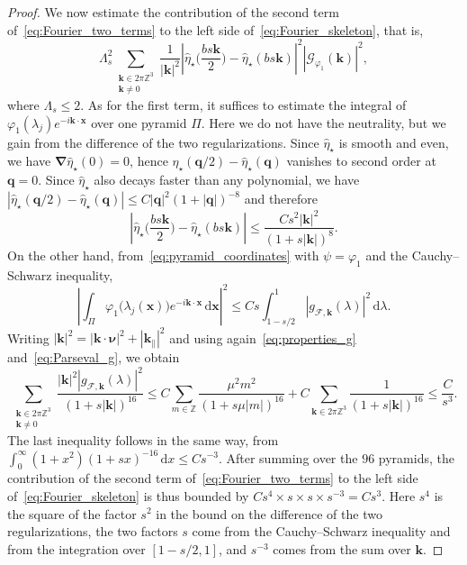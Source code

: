 \documentclass[final,reqno]{amsart}
\theoremstyle{remark}
\renewcommand{\le}{\leqslant}
\let\phi=\varphi
\newcommand{\wh}[1]{\widehat{#1}}
\newcommand{\ZZ}{\mathbb{Z}}
\newcommand{\grad}{\bm{\nabla}}
\newcommand{\dd}{\mathrm{d}}
\newcommand{\GC}{\mathcal{G}}
\begin{document}
\begin{proof}
We now estimate the contribution of the second term of~\cref{eq:Fourier_two_terms} to the left side of~\cref{eq:Fourier_skeleton}, that is,
$$
\Lambda_s^2\sum_{\substack{\mathbf{k}\in 2\pi\ZZ^3\\ \mathbf{k}\neq0}}\frac{1}{|\mathbf{k}|^2}\left|\wh{\eta}_\star\Big(\frac{bs\mathbf{k}}{2}\Big)-\wh{\eta}_\star(bs\mathbf{k})\right|^2|\GC_{\phi_1}(\mathbf{k})|^2,
$$
where $\Lambda_s\le2$. As for the first term, it suffices to estimate the integral of $\phi_1(\lambda_j)e^{-i\mathbf{k}\cdot\mathbf{x}}$ over one pyramid $\Pi$. Here we do not have the neutrality, but we gain from the difference of the two regularizations. Since $\wh{\eta}_\star$ is smooth and even, we have $\grad\wh{\eta}_\star(0)=0$, hence $\wh{\eta}_\star(\mathbf{q}/2)-\wh{\eta}_\star(\mathbf{q})$ vanishes to second order at $\mathbf{q}=0$. Since $\wh{\eta}_\star$ also decays faster than any polynomial, we have $|\wh{\eta}_\star(\mathbf{q}/2)-\wh{\eta}_\star(\mathbf{q})|\le C|\mathbf{q}|^2(1+|\mathbf{q}|)^{-8}$ and therefore
$$
\left|\wh{\eta}_\star\Big(\frac{bs\mathbf{k}}{2}\Big)-\wh{\eta}_\star(bs\mathbf{k})\right|\le \frac{Cs^2|\mathbf{k}|^2}{(1+s|\mathbf{k}|)^{8}}.
$$
On the other hand, from~\cref{eq:pyramid_coordinates} with $\psi=\phi_1$ and the Cauchy--Schwarz inequality,
$$
\left|\int_\Pi\phi_1\big(\lambda_j(\mathbf{x})\big)e^{-i\mathbf{k}\cdot \mathbf{x}}\,\dd \mathbf{x}\right|^2\le Cs\int_{1-s/2}^1|g_{\mathcal{F},\mathbf{k}}(\lambda)|^2\,\dd\lambda.
$$
Writing $|\mathbf{k}|^2=|\mathbf{k}\cdot \bm{\nu}|^2+|\mathbf{k}_\parallel|^2$ and using again~\cref{eq:properties_g} and~\cref{eq:Parseval_g}, we obtain
$$
\sum_{\substack{\mathbf{k}\in 2\pi\ZZ^3\\ \mathbf{k}\neq0}}\frac{|\mathbf{k}|^2|g_{\mathcal{F},\mathbf{k}}(\lambda)|^2}{(1+s|\mathbf{k}|)^{16}}\le C\sum_{m\in\ZZ}\frac{\mu^2m^2}{(1+s\mu|m|)^{16}}+C\sum_{\mathbf{k}\in 2\pi\ZZ^3}\frac{1}{(1+s|\mathbf{k}|)^{16}}\le \frac{C}{s^3}.
$$
The last inequality follows in the same way, from $\int_0^\infty(1+x^2)(1+sx)^{-16}\,\dd x\le Cs^{-3}$. After summing over the $96$ pyramids, the contribution of the second term of~\cref{eq:Fourier_two_terms} to the left side of~\cref{eq:Fourier_skeleton} is thus bounded by $Cs^4\times s\times s\times s^{-3}=Cs^3$. Here $s^4$ is the square of the factor $s^2$ in the bound on the difference of the two regularizations, the two factors $s$ come from the Cauchy--Schwarz inequality and from the integration over $[1-s/2,1]$, and $s^{-3}$ comes from the sum over $\mathbf{k}$.
\end{proof}
\end{document}
